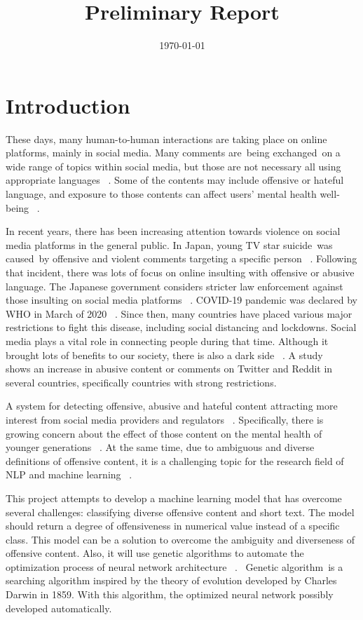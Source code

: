 \documentclass[12pt, natbib=false]{article}
\date{\today}
\title{Preliminary Report}
\begin{document}
\maketitle

\section{Introduction}
These days, many human-to-human interactions are taking place on online platforms, mainly in social media.
Many comments are being exchanged on a wide range of topics within social media, but those are not necessary all using appropriate languages ~\cite{hada2021ruddit}.
Some of the contents may include offensive or hateful language, and exposure to those contents can affect users’ mental health well-being ~\cite{hada2021ruddit}.

In recent years, there has been increasing attention towards violence on social media platforms in the general public.
In Japan, young TV star suicide was caused by offensive and violent comments targeting a specific person ~\cite{HanaK}.
Following that incident, there was lots of focus on online insulting with offensive or abusive language. The Japanese government considers stricter law enforcement against those insulting on social media platforms ~\cite{JpGov}.
COVID-19 pandemic was declared by WHO in March of 2020 ~\cite{whoCovid}.
Since then, many countries have placed various major restrictions to fight this disease, including social distancing and lockdowns. Social media plays a vital role in connecting people during that time. Although it brought lots of benefits to our society, there is also a dark side ~\cite{liu2021covid}.
A study ~\cite{babvey2021using} shows an increase in abusive content or comments on Twitter and Reddit in several countries, specifically countries with strong restrictions.

A system for detecting offensive, abusive and hateful content attracting more interest from social media providers and regulators ~\cite{vidgen2019challenges}.
Specifically, there is growing concern about the effect of those content on the mental health of younger generations ~\cite{babvey2021using}.
At the same time, due to ambiguous and diverse definitions of offensive content, it is a challenging topic for the research field of NLP and machine learning ~\cite{vidgen2019challenges}.

This project attempts to develop a machine learning model that has overcome several challenges: classifying diverse offensive content and short text.
The model should return a degree of offensiveness in numerical value instead of a specific class.
This model can be a solution to overcome the ambiguity and diverseness of offensive content.
Also, it will use genetic algorithms to automate the optimization process of neural network architecture ~\cite{andersen2021evolving}. 
Genetic algorithm is a searching algorithm inspired by the theory of evolution developed by Charles Darwin in 1859.
With this algorithm, the optimized neural network possibly developed automatically.
\end{document}
